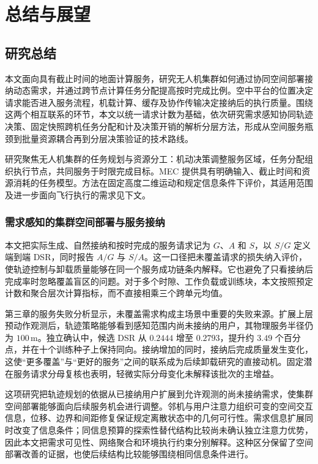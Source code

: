 \chapter{总结与展望}
\label{cha:conclusion}

\section{研究总结}
\label{sec:ch6-summary}

本文面向具有截止时间的地面计算服务，研究无人机集群如何通过协同空间部署接纳动态需求，并通过跨节点计算任务分配提高按时完成比例。空中平台的位置决定请求能否进入服务流程，机载计算、缓存及协作传输决定接纳后的执行质量。围绕这两个相互联系的环节，本文以统一请求计数为基础，依次研究需求感知协同轨迹决策、固定快照跨机任务分配和计及决策开销的解析分层方法，形成从空间服务瓶颈到批量资源耦合再到分层决策验证的技术路线。

研究聚焦无人机集群的任务规划与资源分工：机动决策调整服务区域，任务分配组织执行节点，共同服务于时限完成目标。MEC 提供具有明确输入、截止时间和资源消耗的任务模型。方法在固定高度二维运动和规定信息条件下评价，其适用范围及进一步面向飞行执行的需求见下文。

\subsection{需求感知的集群空间部署与服务接纳}
\label{sec:ch6-observation-summary}

本文把实际生成、自然接纳和按时完成的服务请求记为 $G$、$A$ 和 $S$，以 $S/G$ 定义端到端 DSR，同时报告 $A/G$ 与 $S/A$。这一口径把未覆盖请求的损失纳入评价，使轨迹控制与卸载质量能够在同一个服务成功链条内解释。它也避免了只看接纳后完成率时忽略覆盖盲区的问题。对于多个时隙、工作负载或训练块，本文按照预定计数和聚合层次计算指标，而不直接相乘三个跨单元均值。

第三章的服务失败分析显示，未覆盖需求构成主场景中重要的失败来源。扩展上层预动作观测后，轨迹策略能够看到感知范围内尚未接纳的用户，其物理服务半径仍为 $100\,\mathrm{m}$。独立确认中，候选 DSR 从 $0.2444$ 增至 $0.2793$，提升约 $3.49$ 个百分点，并在十个训练种子上保持同向。接纳增加的同时，接纳后完成质量发生变化，这使“更多覆盖”与“更好的服务”之间的联系成为后续卸载研究的直接动机。固定潜在服务请求分母复核也表明，轻微实际分母变化未解释该批次的主增益。

这项研究把轨迹规划的依据从已接纳用户扩展到允许观测的尚未接纳需求，使集群空间部署能够面向后续服务机会进行调整。邻机与用户注意力组织可变的空间交互信息，位移、边界和间距修复保证规定离散状态中的几何可行性。需求信息扩展同时改变了信息条件；同信息预算的探索性替代结构比较尚未确认独立注意力优势，因此本文把需求可见性、网络聚合和环境执行约束分别解释。这种区分保留了空间部署改善的证据，也使后续结构比较能够围绕相同信息条件进行。

